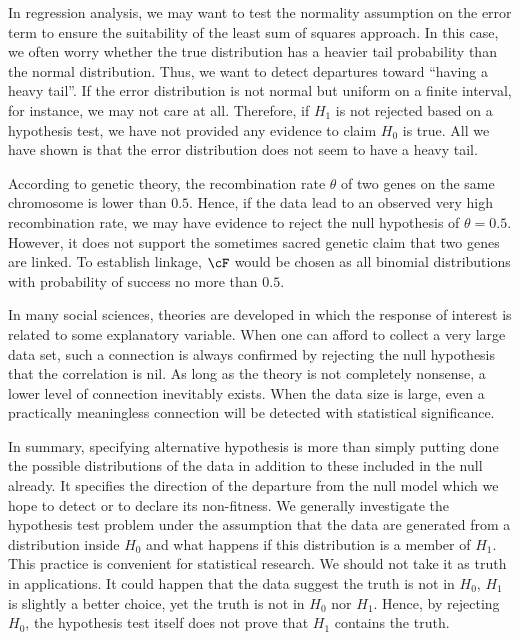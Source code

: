 In regression analysis, we may want to test the normality assumption on
the error term to ensure the suitability of the least sum of squares approach.
In this case, we often worry whether the true distribution has
a heavier tail probability than the normal distribution. Thus, we
want to detect departures toward ``having a heavy tail''. 
If the error distribution is not normal but uniform on a finite interval, 
for instance, we may not care at all. Therefore, if $H_1$ is
not rejected based on a hypothesis test,  we have not
provided any evidence to claim $H_0$ is true.
All we have shown is that the error distribution does not 
seem to have a heavy tail.

According to genetic theory, the recombination rate $\theta$
of two genes on the same chromosome is lower than $0.5$. 
Hence, if the data lead to an observed very high recombination
rate, we may have evidence to reject the null hypothesis
of $\theta = 0.5$. However, it does not support the sometimes
sacred genetic claim that two genes are linked. 
To establish linkage, $\cF$ would be chosen as all binomial distributions 
with probability of success no more than $0.5$.

In many social sciences, theories are developed in which the
response of interest is related to some explanatory variable.
When one can afford to collect a very large data set, such a
connection is always confirmed by rejecting the null hypothesis
that the correlation is nil. As long as the theory is not completely
nonsense, a lower level of connection inevitably exists.
When the data size is large, even a practically meaningless
connection will be detected with statistical significance. 

In summary, specifying alternative hypothesis is more than simply
putting done the possible distributions of the data in addition
to these included in the null already. It specifies the direction of
the departure from the null model which we hope to detect
or to declare its non-fitness. We generally investigate
the hypothesis test problem under the assumption that the
data are generated from a distribution inside $H_0$
and what happens if this distribution is a member of $H_1$.
This practice is convenient for statistical research. We should
not take it as truth in applications. It could happen that the
data suggest the truth is not in $H_0$, $H_1$ is slightly
a better choice, yet the truth is not in $H_0$ nor $H_1$.
Hence, by rejecting $H_0$, the hypothesis test itself does not
prove that $H_1$ contains the truth.


